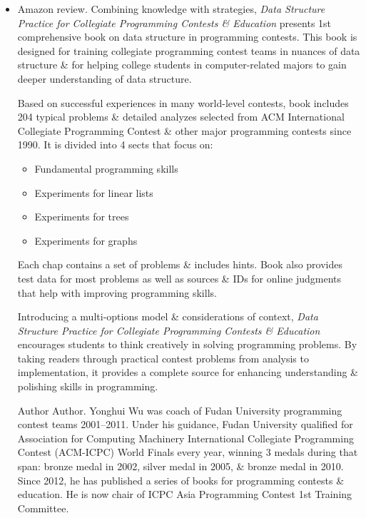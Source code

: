 \documentclass{article}
\begin{document}
\begin{itemize}
	\item {\sf Amazon review.} Combining knowledge with strategies, {\it Data Structure Practice for Collegiate Programming Contests \& Education} presents 1st comprehensive book on data structure in programming contests. This book is designed for training collegiate programming contest teams in nuances of data structure \& for helping college students in computer-related majors to gain deeper understanding of data structure.
	
	Based on successful experiences in many world-level contests, book includes 204 typical problems \& detailed analyzes selected from ACM International Collegiate Programming Contest \& other major programming contests since 1990. It is divided into 4 sects that focus on:
	\begin{itemize}
		\item Fundamental programming skills
		\item Experiments for linear lists
		\item Experiments for trees
		\item Experiments for graphs
	\end{itemize}
	Each chap contains a set of problems \& includes hints. Book also provides test data for most problems as well as sources \& IDs for online judgments that help with improving programming skills.
	
	Introducing a multi-options model \& considerations of context, {\it Data Structure Practice for Collegiate Programming Contests \& Education} encourages students to think creatively in solving programming problems. By taking readers through practical contest problems from analysis to implementation, it provides a complete source for enhancing understanding \& polishing skills in programming.
	
	{\sf Author Author.} {\sc Yonghui Wu} was coach of Fudan University programming contest teams 2001--2011. Under his guidance, Fudan University qualified for Association for Computing Machinery International Collegiate Programming Contest (ACM-ICPC) World Finals every year, winning 3 medals during that span: bronze medal in 2002, silver medal in 2005, \& bronze medal in 2010. Since 2012, he has published a series of books for programming contests \& education. He is now chair of ICPC Asia Programming Contest 1st Training Committee.
	

\end{itemize}
\end{document}
